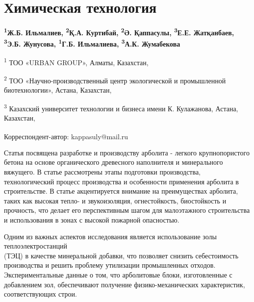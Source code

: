\let\cleardoublepage\clearpage
\chapter{Химическая технология}

\begin{articleheader}

{\bfseries
\textsuperscript{1}Ж.Б. Ильмалиев,
\textsuperscript{2}Қ.А. Куртибай,
\textsuperscript{2}Ә. Қаппасулы\textsuperscript{\envelope },
\textsuperscript{3}Е.Е. Жатқанбаев,
\textsuperscript{3}Э.Б. Жунусова,
\textsuperscript{1}Г.Б. Ильмалиева,
\textsuperscript{3}А.К. Жумабекова
}
\end{articleheader}

\begin{affiliation}
\textsuperscript{1} ТОО «URBAN GROUP», Алматы, Казахстан,

\textsuperscript{2} ТОО «Научно-производственный центр экологической и промышленной биотехнологии», Астана, Казахстан,

\textsuperscript{3} Казахский университет технологии и бизнеса имени К. Кулажанова, Астана, Казахстан,

\raggedright \textsuperscript{\envelope } Корреспондент-автор: kappasuly@mail.ru
\end{affiliation}

Статья посвящена разработке и производству арболита - легкого
крупнопористого бетона на основе органического древесного наполнителя и
минерального вяжущего. В статье рассмотрены этапы подготовки
производства, технологический процесс производства и особенности
применения арболита в строительстве. В статье акцентируется внимание на
преимуществах арболита, таких как высокая тепло- и звукоизоляция,
огнестойкость, биостойкость и прочность, что делает его перспективным
шагом для малоэтажного строительства и использования в зонах с высокой
пожарной опасностью.

Одним из важных аспектов исследования является использование золы
теплоэлектростанций \\(ТЭЦ) в качестве минеральной добавки, что позволяет
снизить себестоимость производства и решить проблему утилизации
промышленных отходов. Экспериментальные данные о том, что арболитовые
блоки, изготовленные с добавлением зол, обеспечивают получение
физико-механических характеристик, соответствующих строи.

